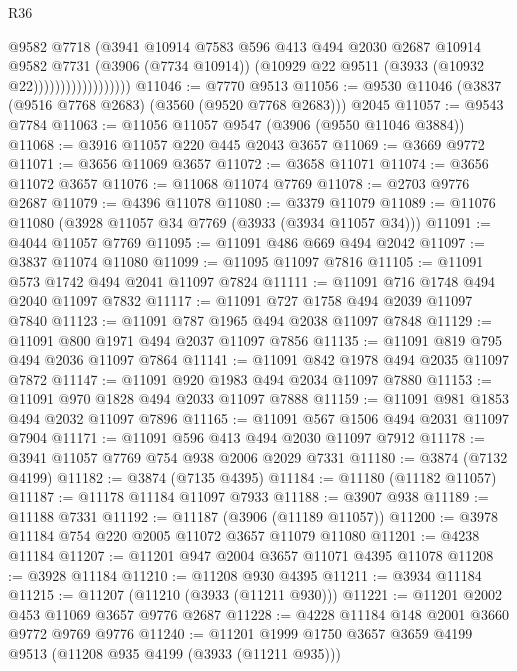 \begin{lexlean}{R36}
\begin{coremodule}
                                @9582
                                @7718
                                (@3941
                                  @10914
                                  @7583
                                  @596
                                  @413
                                  @494
                                  @2030
                                  @2687
                                  @10914
                                  @9582
                                  @7731
                                  (@3906 (@7734 @10914))
                                  (@10929 @22 @9511 (@3933 (@10932 @22))))))))))))))))))
@11046 := @7770 @9513
@11056 := @9530 @11046 (@3837 (@9516 @7768 @2683) (@3560 (@9520 @7768 @2683))) @2045
@11057 := @9543 @7784
@11063 := @11056 @11057 @9547 (@3906 (@9550 @11046 @3884))
@11068 := @3916 @11057 @220 @445 @2043 @3657
@11069 := @3669 @9772
@11071 := @3656 @11069 @3657
@11072 := @3658 @11071
@11074 := @3656 @11072 @3657
@11076 := @11068 @11074 @7769
@11078 := @2703 @9776 @2687
@11079 := @4396 @11078
@11080 := @3379 @11079
@11089 := @11076 @11080 (@3928 @11057 @34 @7769 (@3933 (@3934 @11057 @34)))
@11091 := @4044 @11057 @7769
@11095 := @11091 @486 @669 @494 @2042
@11097 := @3837 @11074 @11080
@11099 := @11095 @11097 @7816
@11105 := @11091 @573 @1742 @494 @2041 @11097 @7824
@11111 := @11091 @716 @1748 @494 @2040 @11097 @7832
@11117 := @11091 @727 @1758 @494 @2039 @11097 @7840
@11123 := @11091 @787 @1965 @494 @2038 @11097 @7848
@11129 := @11091 @800 @1971 @494 @2037 @11097 @7856
@11135 := @11091 @819 @795 @494 @2036 @11097 @7864
@11141 := @11091 @842 @1978 @494 @2035 @11097 @7872
@11147 := @11091 @920 @1983 @494 @2034 @11097 @7880
@11153 := @11091 @970 @1828 @494 @2033 @11097 @7888
@11159 := @11091 @981 @1853 @494 @2032 @11097 @7896
@11165 := @11091 @567 @1506 @494 @2031 @11097 @7904
@11171 := @11091 @596 @413 @494 @2030 @11097 @7912
@11178 := @3941 @11057 @7769 @754 @938 @2006 @2029 @7331
@11180 := @3874 (@7132 @4199)
@11182 := @3874 (@7135 @4395)
@11184 := @11180 (@11182 @11057)
@11187 := @11178 @11184 @11097 @7933
@11188 := @3907 @938
@11189 := @11188 @7331
@11192 := @11187 (@3906 (@11189 @11057))
@11200 := @3978 @11184 @754 @220 @2005 @11072 @3657 @11079 @11080
@11201 := @4238 @11184
@11207 := @11201 @947 @2004 @3657 @11071 @4395 @11078
@11208 := @3928 @11184
@11210 := @11208 @930 @4395
@11211 := @3934 @11184
@11215 := @11207 (@11210 (@3933 (@11211 @930)))
@11221 := @11201 @2002 @453 @11069 @3657 @9776 @2687
@11228 := @4228 @11184 @148 @2001 @3660 @9772 @9769 @9776
@11240 := @11201 @1999 @1750 @3657 @3659 @4199 @9513 (@11208 @935 @4199 (@3933 (@11211 @935)))

\end{coremodule}
\end{lexlean}
